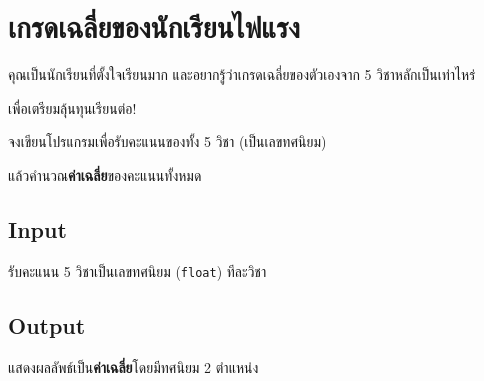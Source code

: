 \documentclass{article}
\begin{document}
\section*{เกรดเฉลี่ยของนักเรียนไฟแรง}

คุณเป็นนักเรียนที่ตั้งใจเรียนมาก และอยากรู้ว่าเกรดเฉลี่ยของตัวเองจาก 5 วิชาหลักเป็นเท่าไหร่

เพื่อเตรียมลุ้นทุนเรียนต่อ!



จงเขียนโปรแกรมเพื่อรับคะแนนของทั้ง 5 วิชา (เป็นเลขทศนิยม)

แล้วคำนวณ\textbf{ค่าเฉลี่ย}ของคะแนนทั้งหมด



\subsection*{Input}
รับคะแนน 5 วิชาเป็นเลขทศนิยม (\texttt{float}) ทีละวิชา\\



\subsection*{Output}
แสดงผลลัพธ์เป็น\textbf{ค่าเฉลี่ย}โดยมีทศนิยม 2 ตำแหน่ง\\
\end{document}
